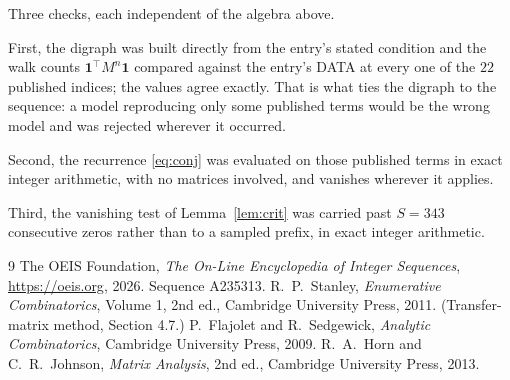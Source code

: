 \documentclass[11pt,a4paper]{article}
\theoremstyle{plain}
\theoremstyle{definition}
\begin{document}
Three checks, each independent of the algebra above.

First, the digraph was built directly from the entry's stated condition and the walk counts
$\mathbf{1}^{\!\top}M^{n}\mathbf{1}$ compared against the entry's DATA at every one of
the $22$ published indices; the values agree exactly. That is what ties the digraph to
the sequence: a model reproducing only some published terms would be the wrong model and
was rejected wherever it occurred.

Second, the recurrence \eqref{eq:conj} was evaluated on those published terms in exact
integer arithmetic, with no matrices involved, and vanishes wherever it applies.

Third, the vanishing test of Lemma~\ref{lem:crit} was carried past $S=343$ consecutive
zeros rather than to a sampled prefix, in exact integer arithmetic.

\begin{thebibliography}{9}
 The OEIS Foundation, \emph{The On-Line Encyclopedia of Integer
Sequences}, \url{https://oeis.org}, 2026. Sequence A235313.
 R.~P.~Stanley, \emph{Enumerative Combinatorics}, Volume 1, 2nd ed.,
Cambridge University Press, 2011. (Transfer-matrix method, Section 4.7.)
 P.~Flajolet and R.~Sedgewick, \emph{Analytic Combinatorics}, Cambridge
University Press, 2009.
 R.~A.~Horn and C.~R.~Johnson, \emph{Matrix Analysis}, 2nd ed., Cambridge
University Press, 2013.
\end{thebibliography}
\end{document}
